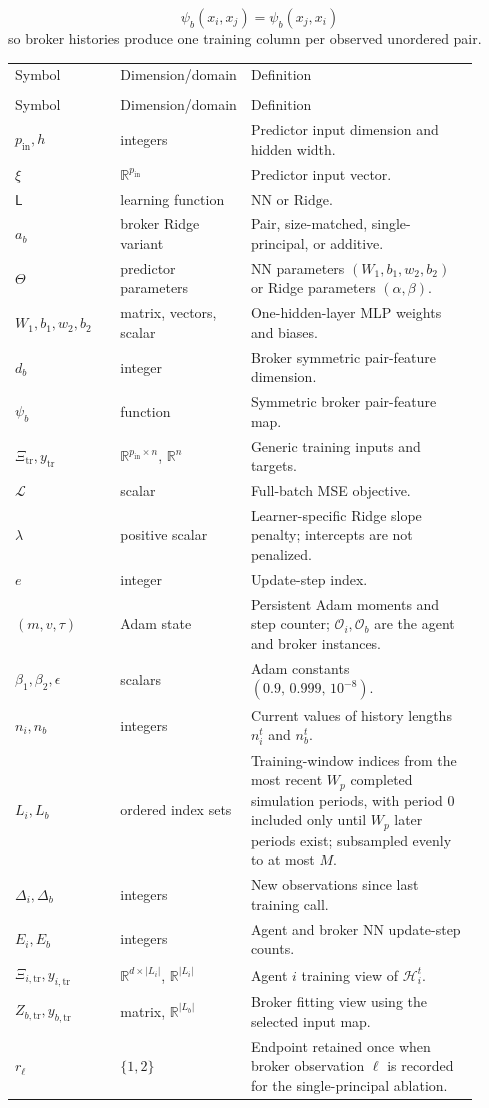 \documentclass[11pt]{article}
\makeatletter
\newcommand{\R}{\mathbb{R}}
\newenvironment{localvartable}[1]{%
\begingroup
\small
\setlength{\tabcolsep}{4pt}
\renewcommand{\arraystretch}{1.08}
\begin{longtable}{>{\raggedright\arraybackslash}p{0.23\linewidth}
                >{\raggedright\arraybackslash}p{0.18\linewidth}
                >{\raggedright\arraybackslash}p{0.51\linewidth}}
\toprule
\multicolumn{3}{@{}l}{\textit{Local variables for #1}}\\
\midrule
Symbol & Dimension/domain & Definition \\
\midrule
\endfirsthead
\toprule
\multicolumn{3}{@{}l}{\textit{Local variables for #1 (continued)}}\\
\midrule
Symbol & Dimension/domain & Definition \\
\midrule
\endhead
}{%
\bottomrule
\end{longtable}
\endgroup
}
\makeatother
\begin{document}
\[
\psi_b(x_i,x_j)=\psi_b(x_j,x_i)
\]
so broker histories produce one training column per observed unordered pair.

\begin{localvartable}{training}
$p_{\mathrm{in}},h$ & integers & Predictor input dimension and hidden width. \\
$\xi$ & $\R^{p_{\mathrm{in}}}$ & Predictor input vector. \\
$\mathsf L$ & learning function & $\mathrm{NN}$ or $\mathrm{Ridge}$. \\
$a_b$ & broker Ridge variant & Pair, size-matched, single-principal, or additive. \\
$\Theta$ & predictor parameters & NN parameters $(W_1,b_1,w_2,b_2)$ or Ridge parameters $(\alpha,\beta)$. \\
$W_1,b_1,w_2,b_2$ & matrix, vectors, scalar & One-hidden-layer MLP weights and biases. \\
$d_b$ & integer & Broker symmetric pair-feature dimension. \\
$\psi_b$ & function & Symmetric broker pair-feature map. \\
$\Xi_{\mathrm{tr}},y_{\mathrm{tr}}$ & $\R^{p_{\mathrm{in}}\times n}$, $\R^n$ & Generic training inputs and targets. \\
$\mathcal L$ & scalar & Full-batch MSE objective. \\
$\lambda$ & positive scalar & Learner-specific Ridge slope penalty; intercepts are not penalized. \\
$e$ & integer & Update-step index. \\
$(m,v,\tau)$ & Adam state & Persistent Adam moments and step counter; $\mathcal O_i,\mathcal O_b$ are the agent and broker instances. \\
$\beta_1,\beta_2,\epsilon$ & scalars & Adam constants $(0.9,\,0.999,\,10^{-8})$. \\
$n_i,n_b$ & integers & Current values of history lengths $n_i^t$ and $n_b^t$. \\
$L_i,L_b$ & ordered index sets & Training-window indices from the most recent $W_p$ completed simulation periods, with period 0 included only until $W_p$ later periods exist; subsampled evenly to at most $M$. \\
$\Delta_i,\Delta_b$ & integers & New observations since last training call. \\
$E_i,E_b$ & integers & Agent and broker NN update-step counts. \\
$\Xi_{i,\mathrm{tr}},y_{i,\mathrm{tr}}$ & $\R^{d\times |L_i|}$, $\R^{|L_i|}$ & Agent $i$ training view of $\mathcal H_i^t$. \\
$Z_{b,\mathrm{tr}},y_{b,\mathrm{tr}}$ & matrix, $\R^{|L_b|}$ & Broker fitting view using the selected input map. \\
$r_\ell$ & $\{1,2\}$ & Endpoint retained once when broker observation $\ell$ is recorded for the single-principal ablation. \\
\end{localvartable}
\end{document}
